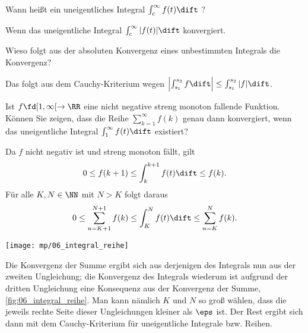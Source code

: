   \begin{frage}
    Wann heißt ein uneigentliches Integral 
    $\int_c^\infty f(t)\dift$ ?
  \end{frage}

  \begin{antwort}
    Wenn das uneigentliche Integral 
    $\int_c^\infty | f(t) | \dift$ konvergiert.
    \AntEnd
  \end{antwort}

  \begin{frage}
    Wieso folgt aus der absoluten Konvergenz eines 
    unbestimmten Integrals die Konvergenz?
  \end{frage}

  \begin{antwort}
    Das folgt aus dem Cauchy-Kriterium wegen 
    $\left| \int_{s_1}^{s_2} f  \dift \right|
    \le  \int_{s_1}^{s_2} |f| \dift $. 
    \AntEnd
  \end{antwort}

  \begin{frage}\label{06_itsu}
    Ist $f\fd [1,\infty[ \to\RR$ eine nicht negative streng monoton 
    fallende Funktion. Können Sie zeigen, dass die Reihe 
    $\sum_{k=1}^\infty f(k)$ genau dann konvergiert, wenn das 
    uneigentliche Integral $\int_1^\infty f(t)\dift$ existiert?
  \end{frage}


  \begin{antwort}
    Da $f$ nicht negativ ist und streng monoton fällt, gilt 
    \[
    0\le f(k+1) \le  \int_k^{k+1} f(t) \dift \le 
    f(k) .
    \]
    Für alle $K,N\in \NN$ mit $N>K$ folgt daraus
    \[
    0 \le \sum_{n=K+1}^{N+1} f(k) \le 
    \int_K^N f(t) \dift  \le \sum_{n=K}^{N} f(k).
    \]

    \begin{center}
      \texttt{[image: mp/06\_integral\_reihe]}
      \label{fig:06_integral_reihe}
    \end{center}

    Die Konvergenz der Summe ergibt sich aus derjenigen des Integrals 
    nun aus der zweiten Ungleichung; die Konvergenz 
    des Integrals wiederum ist aufgrund der dritten Ungleichung 
    eine Konsequenz aus der Konvergenz der Summe, \sieheAbbildung\ref{fig:06_integral_reihe}. 
    Man kann nämlich $K$ und $N$ so groß wählen, 
    dass die jeweils rechte Seite dieser 
    Ungleichungen kleiner als $\eps$ ist. Der Rest ergibt 
    sich dann mit dem Cauchy-Kriterium für uneigentliche Integrale bzw. 
    Reihen.
    \AntEnd         
  \end{antwort}

